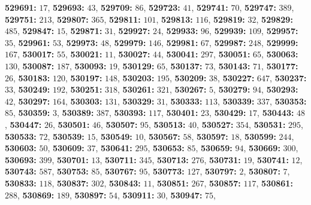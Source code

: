 \textsf{\bfseries 529691:} $17$, \textsf{\bfseries 529693:} $43$, \textsf{\bfseries 529709:} $86$, \textsf{\bfseries 529723:} $41$, \textsf{\bfseries 529741:} $70$, \textsf{\bfseries 529747:} $389$, \textsf{\bfseries 529751:} $213$, \textsf{\bfseries 529807:} $365$, \textsf{\bfseries 529811:} $101$, \textsf{\bfseries 529813:} $116$, \textsf{\bfseries 529819:} $32$, \textsf{\bfseries 529829:} $485$, \textsf{\bfseries 529847:} $15$, \textsf{\bfseries 529871:} $31$, \textsf{\bfseries 529927:} $24$, \textsf{\bfseries 529933:} $96$, \textsf{\bfseries 529939:} $109$, \textsf{\bfseries 529957:} $35$, \textsf{\bfseries 529961:} $53$, \textsf{\bfseries 529973:} $48$, \textsf{\bfseries 529979:} $146$, \textsf{\bfseries 529981:} $67$, \textsf{\bfseries 529987:} $248$, \textsf{\bfseries 529999:} $167$, \textsf{\bfseries 530017:} $55$, \textsf{\bfseries 530021:} $11$, \textsf{\bfseries 530027:} $44$, \textsf{\bfseries 530041:} $297$, \textsf{\bfseries 530051:} $65$, \textsf{\bfseries 530063:} $130$, \textsf{\bfseries 530087:} $187$, \textsf{\bfseries 530093:} $19$, \textsf{\bfseries 530129:} $65$, \textsf{\bfseries 530137:} $73$, \textsf{\bfseries 530143:} $71$, \textsf{\bfseries 530177:} $26$, \textsf{\bfseries 530183:} $120$, \textsf{\bfseries 530197:} $148$, \textsf{\bfseries 530203:} $195$, \textsf{\bfseries 530209:} $38$, \textsf{\bfseries 530227:} $647$, \textsf{\bfseries 530237:} $33$, \textsf{\bfseries 530249:} $192$, \textsf{\bfseries 530251:} $318$, \textsf{\bfseries 530261:} $321$, \textsf{\bfseries 530267:} $5$, \textsf{\bfseries 530279:} $94$, \textsf{\bfseries 530293:} $42$, \textsf{\bfseries 530297:} $164$, \textsf{\bfseries 530303:} $131$, \textsf{\bfseries 530329:} $31$, \textsf{\bfseries 530333:} $113$, \textsf{\bfseries 530339:} $337$, \textsf{\bfseries 530353:} $85$, \textsf{\bfseries 530359:} $3$, \textsf{\bfseries 530389:} $387$, \textsf{\bfseries 530393:} $117$, \textsf{\bfseries 530401:} $23$, \textsf{\bfseries 530429:} $17$, \textsf{\bfseries 530443:} $48$, \textsf{\bfseries 530447:} $26$, \textsf{\bfseries 530501:} $46$, \textsf{\bfseries 530507:} $95$, \textsf{\bfseries 530513:} $40$, \textsf{\bfseries 530527:} $354$, \textsf{\bfseries 530531:} $295$, \textsf{\bfseries 530533:} $72$, \textsf{\bfseries 530539:} $15$, \textsf{\bfseries 530549:} $10$, \textsf{\bfseries 530567:} $58$, \textsf{\bfseries 530597:} $18$, \textsf{\bfseries 530599:} $244$, \textsf{\bfseries 530603:} $50$, \textsf{\bfseries 530609:} $37$, \textsf{\bfseries 530641:} $295$, \textsf{\bfseries 530653:} $85$, \textsf{\bfseries 530659:} $94$, \textsf{\bfseries 530669:} $300$, \textsf{\bfseries 530693:} $399$, \textsf{\bfseries 530701:} $13$, \textsf{\bfseries 530711:} $345$, \textsf{\bfseries 530713:} $276$, \textsf{\bfseries 530731:} $19$, \textsf{\bfseries 530741:} $12$, \textsf{\bfseries 530743:} $587$, \textsf{\bfseries 530753:} $85$, \textsf{\bfseries 530767:} $95$, \textsf{\bfseries 530773:} $127$, \textsf{\bfseries 530797:} $2$, \textsf{\bfseries 530807:} $7$, \textsf{\bfseries 530833:} $118$, \textsf{\bfseries 530837:} $302$, \textsf{\bfseries 530843:} $11$, \textsf{\bfseries 530851:} $267$, \textsf{\bfseries 530857:} $117$, \textsf{\bfseries 530861:} $288$, \textsf{\bfseries 530869:} $189$, \textsf{\bfseries 530897:} $54$, \textsf{\bfseries 530911:} $30$, \textsf{\bfseries 530947:} $75$, 
